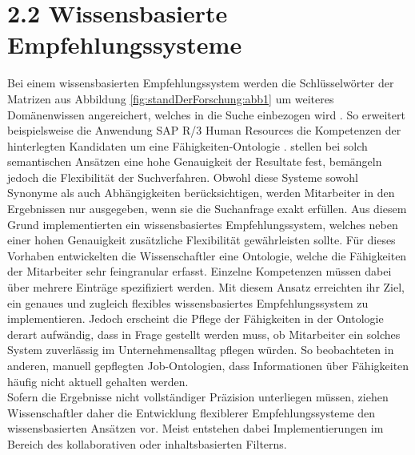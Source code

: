 \section[Wissensbasierte Empfehlungssysteme]{2.2 Wissensbasierte Empfehlungssysteme}
\label{ch:standDerForschung:wissensbasierteAnsaetze}
Bei einem wissensbasierten Empfehlungssystem werden die Schlüsselwörter der Matrizen aus Abbildung \ref{fig:standDerForschung:abb1} um weiteres Domänenwissen angereichert, welches in die Suche einbezogen wird \cite[S. 168f.]{recommenderSystems:2016}. So erweitert beispielsweise die Anwendung SAP R/3 Human Resources die Kompetenzen der hinterlegten Kandidaten um eine Fähigkeiten-Ontologie \cite[S. 2]{malinowski:2006}. \textcite[S. 3]{bianchini:2008} stellen bei solch semantischen Ansätzen eine hohe Genauigkeit der Resultate fest, bemängeln jedoch die Flexibilität der Suchverfahren. Obwohl diese Systeme sowohl Synonyme als auch Abhängigkeiten berücksichtigen, werden Mitarbeiter in den Ergebnissen nur ausgegeben, wenn sie die Suchanfrage exakt erfüllen. Aus diesem Grund implementierten \textcite[S. 4ff.]{semanticMatchmaking:2009} ein wissensbasiertes Empfehlungssystem, welches neben einer hohen Genauigkeit zusätzliche Flexibilität gewährleisten sollte. Für dieses Vorhaben entwickelten die Wissenschaftler eine Ontologie, welche die Fähigkeiten der Mitarbeiter sehr feingranular erfasst. Einzelne Kompetenzen müssen dabei über mehrere Einträge spezifiziert werden. Mit diesem Ansatz erreichten \textcite[S. 11f.]{semanticMatchmaking:2009} ihr Ziel, ein genaues und zugleich flexibles wissensbasiertes Empfehlungssystem zu implementieren. Jedoch erscheint die Pflege der Fähigkeiten in der Ontologie derart aufwändig, dass in Frage gestellt werden muss, ob Mitarbeiter ein solches System zuverlässig im Unternehmensalltag pflegen würden. So beobachteten \textcite[S. 2]{aCombinedRepresentation:2018} in anderen, manuell gepflegten Job-Ontologien, dass Informationen über Fähigkeiten häufig nicht aktuell gehalten werden. \\
Sofern die Ergebnisse nicht vollständiger Präzision unterliegen müssen, ziehen Wissenschaftler daher die Entwicklung flexiblerer Empfehlungssysteme den wissensbasierten Ansätzen vor. Meist entstehen dabei Implementierungen im Bereich des kollaborativen oder inhaltsbasierten Filterns.

